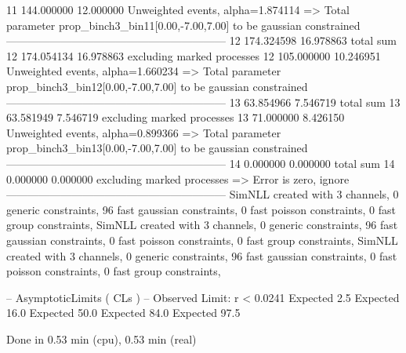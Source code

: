 11         144.000000      12.000000       Unweighted events, alpha=1.874114
  => Total parameter prop_binch3_bin11[0.00,-7.00,7.00] to be gaussian constrained
------------------------------------------------------------
12         174.324598      16.978863       total sum                     
12         174.054134      16.978863       excluding marked processes    
12         105.000000      10.246951       Unweighted events, alpha=1.660234
  => Total parameter prop_binch3_bin12[0.00,-7.00,7.00] to be gaussian constrained
------------------------------------------------------------
13         63.854966       7.546719        total sum                     
13         63.581949       7.546719        excluding marked processes    
13         71.000000       8.426150        Unweighted events, alpha=0.899366
  => Total parameter prop_binch3_bin13[0.00,-7.00,7.00] to be gaussian constrained
------------------------------------------------------------
14         0.000000        0.000000        total sum                     
14         0.000000        0.000000        excluding marked processes    
  => Error is zero, ignore      
------------------------------------------------------------
SimNLL created with 3 channels, 0 generic constraints, 96 fast gaussian constraints, 0 fast poisson constraints, 0 fast group constraints, 
SimNLL created with 3 channels, 0 generic constraints, 96 fast gaussian constraints, 0 fast poisson constraints, 0 fast group constraints, 
SimNLL created with 3 channels, 0 generic constraints, 96 fast gaussian constraints, 0 fast poisson constraints, 0 fast group constraints, 

 -- AsymptoticLimits ( CLs ) --
Observed Limit: r < 0.0241
Expected  2.5%
Expected 16.0%
Expected 50.0%
Expected 84.0%
Expected 97.5%

Done in 0.53 min (cpu), 0.53 min (real)
